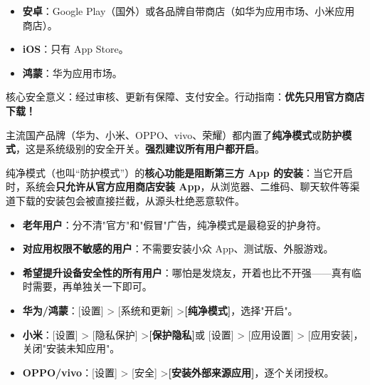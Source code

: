 


\begin{itemize}
  \item \textbf{安卓}：Google Play（国外）或各品牌自带商店（如华为应用市场、小米应用商店）。
  \item \textbf{iOS}：只有 App Store。
  \item \textbf{鸿蒙}：华为应用市场。
\end{itemize}

核心安全意义：经过审核、更新有保障、支付安全。行动指南：\textbf{优先只用官方商店下载！}


主流国产品牌（华为、小米、OPPO、vivo、荣耀）都内置了\textbf{纯净模式}或\textbf{防护模式}，这是系统级别的安全开关。\textbf{强烈建议所有用户都开启}。


纯净模式（也叫“防护模式”）的\textbf{核心功能是阻断第三方 App 的安装}：当它开启时，系统会\textbf{只允许从官方应用商店安装 App}，从浏览器、二维码、聊天软件等渠道下载的安装包会被直接拦截，从源头杜绝恶意软件。


\begin{itemize}
  \item \textbf{老年用户}：分不清"官方"和"假冒"广告，纯净模式是最稳妥的护身符。
  \item \textbf{对应用权限不敏感的用户}：不需要安装小众 App、测试版、外服游戏。
  \item \textbf{希望提升设备安全性的所有用户}：哪怕是发烧友，开着也比不开强——真有临时需要，再单独关一下即可。
\end{itemize}


\begin{itemize}
  \item \textbf{华为/鸿蒙}：[设置] > [系统和更新] >\textbf{[纯净模式]}，选择"开启"。
  \item \textbf{小米}：[设置] > [隐私保护] >\textbf{[保护隐私]}或 [设置] > [应用设置] > [应用安装]，关闭"安装未知应用"。
  \item \textbf{OPPO/vivo}：[设置] > [安全] >\textbf{[安装外部来源应用]}，逐个关闭授权。
\end{itemize}

